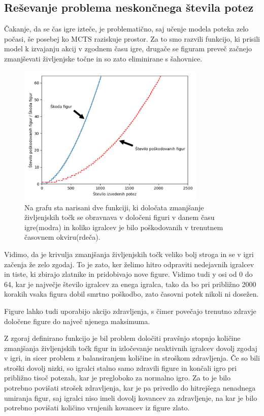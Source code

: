 \documentclass[a4paper, 12pt]{book}
\begin{document}
\subsection{Reševanje problema neskončnega števila potez}
\label{sKillFunction}
Čakanje, da se čas igre izteče, je problematično, saj učenje modela poteka zelo počasi, še posebej ko MCTS raziskuje prostor.
Za to smo razvili funkcijo, ki prisili model k izvajanju akcij v zgodnem času igre, drugače se figuram preveč začnejo zmanjševati življenjske točne in so zato eliminirane s šahovnice.


\begin{figure}[h]
	\begin{center}
		\includegraphics[width=0.8\textwidth]{destroy_formula_2018_11_17.pdf}
	\end{center}
	\caption{Na grafu sta narisani dve funkciji, ki določata zmanjšanje življenjskih točk se obravnava v določeni figuri v danem času igre(modra) in koliko igralcev je bilo poškodovanih v trenutnem časovnem okviru(rdeča).}
	\label{destroy_formula_2018_11_17}
\end{figure}


Vidimo, da je krivulja zmanjšanja življenjskih točk veliko bolj stroga in se v igri začenja že zelo zgodaj. 
To je zato, ker želimo hitro odpraviti nedejavnih igralcev in  tiste, ki zbirajo zlatnike in pridobivajo nove figure.
Vidimo tudi y osi od 0 do 64, kar je največje število igralcev za enega igralca, tako da bo pri približno 2000 korakih vsaka figura dobil smrtno poškodbo, zato časovni potek nikoli ni dosežen.

Figure lahko tudi uporabijo akcijo zdravljenja, s čimer povečajo trenutno zdravje določene figure do največ njenega maksimuma.
	
Z zgoraj definirano funkcijo je bil problem določiti pravšnjo stopnjo količine zmanjšanja življenjskih točk figur in izločevanje neaktivnih igralcev dovolj zgodaj v igri, in sicer problem z balansiranjem količine in stroškom zdravljenja. 
Če so bili stroški dovolj nizki, so igralci stalno samo zdravili figure in končali igro pri približno tisoč potezah, kar je pregloboko za normalno igro.
Za to je bilo potrebno povišati strošek zdravljenja, kar je pa privedlo do hitrejšega nenadnega umiranja figur, saj igralci niso imeli dovolj kovancev za zdravljenje, na kar je bilo potrebno povišati količino vrnjenih kovancev iz figure zlato.
\end{document}

